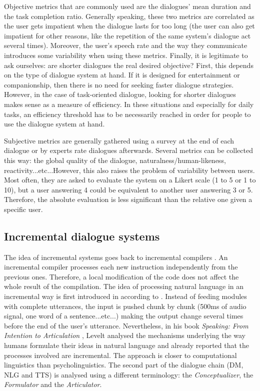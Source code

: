 		Objective metrics that are commonly used are the dialogues' mean duration and the task completion ratio. Generally speaking, these two metrics are correlated as the user gets impatient when the dialogue lasts for too long (the user can also get impatient for other reasons, like the repetition of the same system's dialogue act several times). Moreover, the user's speech rate and the way they communicate introduces some variability when using these metrics. Finally, it is legitimate to ask ourselves: are shorter dialogues the real desired objective? First, this depends on the type of dialogue system at hand. If it is designed for entertainment or companionship, then there is no need for seeking faster dialogue strategies. However, in the case of task-oriented dialogue, looking for shorter dialogues makes sense as a measure of efficiency. In these situations and especially for daily tasks, an efficiency threshold has to be necessarily reached in order for people to use the dialogue system at hand.

		Subjective metrics are generally gathered using a survey at the end of each dialogue or by experts rate dialogues afterwards\cite{El-Asri2014b}. Several metrics can be collected this way: the global quality of the dialogue, naturalness/human-likeness, reactivity...etc...However, this also raises the problem of variability between users. Most often, they are asked to evaluate the system on a Likert scale (1 to 5 or 1 to 10), but a user answering 4 could be equivalent to another user answering 3 or 5. Therefore, the absolute evaluation is less significant than the relative one given a specific user.

	\subsection{Incremental dialogue systems}
    
		The idea of incremental systems goes back to incremental compilers \cite{Lock1965}. An incremental compiler processes each new instruction independently from the previous ones. Therefore, a local modification of the code does not affect the whole result of the compilation. The idea of processing natural language in an incremental way is first introduced in \cite{Wiren1992} according to \cite{Kilger1995}. Instead of feeding modules with complete utterances, the input is pushed chunk by chunk (500ms of audio signal, one word of a sentence...etc...) making the output change several times before the end of the user's utterance. Nevertheless, in his book \textit{Speaking: From Intention to Articulation} \cite{Levelt1989}, Levelt analysed the mechanisms underlying the way humans formulate their ideas in natural language and already reported that the processes involved are incremental. The approach is closer to computational linguistics than psycholinguistics. The second part of the dialogue chain (DM, NLG and TTS) is analysed using a different terminology: the \textit{Conceptualizer}, the \textit{Formulator} and the \textit{Articulator}.

